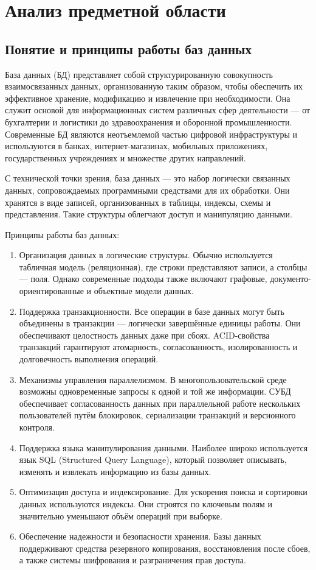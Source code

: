 \section{Анализ предметной области}
\subsection{Понятие и принципы работы баз данных}

База данных (БД) представляет собой структурированную совокупность взаимосвязанных данных, организованную таким образом, чтобы обеспечить их эффективное хранение, модификацию и извлечение при необходимости. Она служит основой для информационных систем различных сфер деятельности — от бухгалтерии и логистики до здравоохранения и оборонной промышленности. Современные БД являются неотъемлемой частью цифровой инфраструктуры и используются в банках, интернет-магазинах, мобильных приложениях, государственных учреждениях и множестве других направлений.

С технической точки зрения, база данных — это набор логически связанных данных, сопровождаемых программными средствами для их обработки. Они хранятся в виде записей, организованных в таблицы, индексы, схемы и представления. Такие структуры облегчают доступ и манипуляцию данными.

Принципы работы баз данных:
\begin{enumerate}
	\item Организация данных в логические структуры. Обычно используется табличная модель (реляционная), где строки представляют записи, а столбцы — поля. Однако современные подходы также включают графовые, документо-ориентированные и объектные модели данных.
	\item Поддержка транзакционности. Все операции в базе данных могут быть объединены в транзакции — логически завершённые единицы работы. Они обеспечивают целостность данных даже при сбоях. ACID-свойства транзакций гарантируют атомарность, согласованность, изолированность и долговечность выполнения операций.
	\item Механизмы управления параллелизмом. В многопользовательской среде возможны одновременные запросы к одной и той же информации. СУБД обеспечивает согласованность данных при параллельной работе нескольких пользователей путём блокировок, сериализации транзакций и версионного контроля.
	\item Поддержка языка манипулирования данными. Наиболее широко используется язык SQL (Structured Query Language), который позволяет описывать, изменять и извлекать информацию из базы данных.
	\item Оптимизация доступа и индексирование. Для ускорения поиска и сортировки данных используются индексы. Они строятся по ключевым полям и значительно уменьшают объём операций при выборке.
	\item Обеспечение надежности и безопасности хранения. Базы данных поддерживают средства резервного копирования, восстановления после сбоев, а также системы шифрования и разграничения прав доступа.
\end{enumerate}

